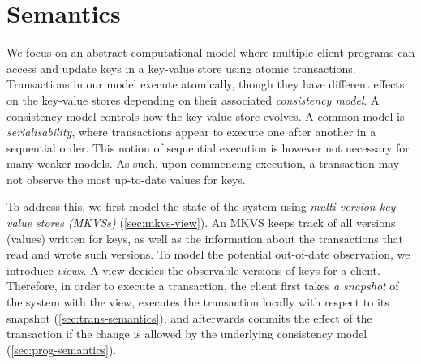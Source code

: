 \section{Semantics}
\label{sec:semantics}

We focus on an abstract computational model where multiple client programs can access and update keys in a key-value store using atomic transactions. 
Transactions in our model execute atomically, though they have different effects on the key-value stores depending on their associated \emph{consistency model}.
A consistency model controls how the key-value store evolves.
A common model is \emph{serialisability}, where transactions appear to execute one after another in a sequential order.
This notion of sequential execution is however not necessary for many weaker models. As such, upon commencing execution, a transaction may not observe the most up-to-date values for keys. 

To address this, we first model the state of the system using \emph{multi-version key-value stores (MKVSs)} (\cref{sec:mkvs-view}). 
An MKVS keeps track of all versions (values) written for keys, as well as the information about the transactions that read and wrote such versions. 
To model the potential out-of-date observation, we introduce \emph{views}.
A view decides the observable versions of keys for a client.
Therefore, in order to execute a transaction, the client first takes \emph{a snapshot} of the system with the view, executes the transaction locally with respect to its snapshot (\cref{sec:trans-semantics}), and afterwards commits the effect of the transaction if the change is allowed by the underlying consistency model (\cref{sec:prog-semantics}).








